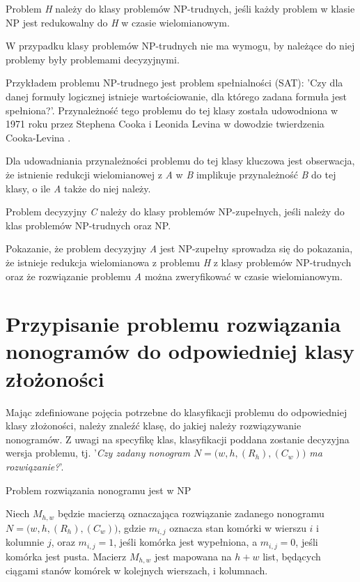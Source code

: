 \begin{definition}
    Problem \textit{H} należy do klasy problemów NP-trudnych, jeśli każdy problem w klasie NP 
jest redukowalny do \textit{H} w czasie wielomianowym.
\end{definition}
    W przypadku klasy problemów NP-trudnych nie ma wymogu, by należące do niej problemy były
problemami decyzyjnymi.
\begin{example}
    Przykładem problemu NP-trudnego jest problem spełnialności (SAT): 'Czy dla danej formuły logicznej
istnieje wartościowanie, dla którego zadana formuła jest spełniona?'. Przynależność tego problemu
do tej klasy została udowodniona w 1971 roku przez Stephena Cooka i Leonida Levina w dowodzie
twierdzenia Cooka-Levina \cite{Cook-Levin}.
\end{example}
    Dla udowadniania przynależności problemu do tej klasy kluczowa jest obserwacja, że istnienie
redukcji wielomianowej z \textit{A} w \textit{B} implikuje przynależność \textit{B} do tej klasy,
o ile \textit{A} także do niej należy.


\begin{definition}
    Problem decyzyjny \textit{C} należy do klasy problemów NP-zupełnych, jeśli należy do klas problemów
NP-trudnych oraz NP.
\end{definition}
\begin{corollary}
    Pokazanie, że problem decyzyjny \textit{A} jest NP-zupełny sprowadza się do pokazania, że istnieje redukcja
wielomianowa z problemu \textit{H} z klasy problemów NP-trudnych oraz że rozwiązanie problemu \textit{A}
można zweryfikować w czasie wielomianowym.
\end{corollary}



\section{Przypisanie problemu rozwiązania nonogramów do odpowiedniej klasy złożoności}

    Mając zdefiniowane pojęcia potrzebne do klasyfikacji problemu do odpowiedniej klasy złożoności,
należy znaleźć klasę, do jakiej należy rozwiązywanie nonogramów. Z uwagi na specyfikę klas, klasyfikacji
poddana zostanie decyzyjna wersja problemu, tj. 
'\textit{Czy zadany nonogram $N = \big(w, h, (R_h), (C_w)\big)$ ma rozwiązanie?}'.


\begin{theorem}
    Problem rozwiązania nonogramu jest w NP
\end{theorem}
    Niech $M_{h, w}$ będzie macierzą oznaczająca rozwiązanie zadanego nonogramu $N = \big(w, h, (R_h), (C_w)\big)$,
gdzie $m_{i, j}$ oznacza stan komórki w wierszu $i$ i kolumnie $j$, oraz $m_{i, j} = 1$, jeśli komórka
jest wypełniona, a $m_{i, j} = 0$, jeśli komórka jest pusta. Macierz $M_{h, w}$ jest mapowana na $h + w$ list,
będących ciągami stanów komórek w kolejnych wierszach, i kolumnach.

